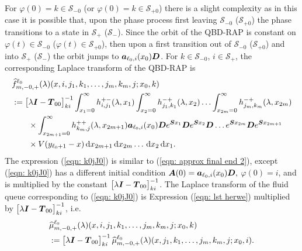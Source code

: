 For \(\varphi(0)=k\in\mathcal S_{-0}\) (or \(\varphi(0)=k\in\mathcal S_{+0}\)) there is a slight complexity as in this case it is possible that, upon the phase process first leaving \(\mathcal S_{-0}\) (\(\mathcal S_{+0}\)) the phase transitions to a state in \(\mathcal S_+\) (\(\mathcal S_-\)). Since the orbit of the QBD-RAP is constant on \(\varphi(t)\in\mathcal S_{-0}\) (\(\varphi(t)\in\mathcal S_{+0}\)), then upon a first transition out of \(\mathcal S_{-0}\) (\(\mathcal S_{+0}\)) and into \(\mathcal S_+\) (\(\mathcal S_-\)) the orbit jumps to \(\boldsymbol   a_{\ell_0,i}(x_0)\boldsymbol D\). For \(k\in\mathcal S_{-0}\), \(i\in\mathcal S_+\), the corresponding Laplace transform of the QBD-RAP is
\begin{align}
	&\widehat{f}_{m,-0,+}^{\ell_0}(\lambda)(x,i,j_1,k_1,\dots,j_m,k_m,j;x_0,k)\nonumber 
	\\&:=\begin{bmatrix} \lambda \boldsymbol I - \boldsymbol T_{00} \end{bmatrix}^{-1}_{ki}\int_{x_1=0}^\infty h^{+-}_{i,j_{1}}(\lambda,x_1)\nonumber
	\int_{x_2=0}^\infty h^{-+}_{j_1,k_1}(\lambda,x_2)
	\hdots \int_{x_{2m}=0}^\infty h^{-+}_{j_{m},k_m}(\lambda, x_{2m})  
	\\&\qquad \times\int_{x_{2m+1}=0}^\infty h^{++}_{k_m,j}(\lambda,x_{2m+1})
	 \boldsymbol   a_{\ell_0,i}(x_0)\boldsymbol De^{\boldsymbol{S}x_1} \boldsymbol{D} e^{\boldsymbol{S}x_2} \boldsymbol{D}\dots e^{\boldsymbol{S}x_{2m}}  \boldsymbol{D}e^{\boldsymbol{S}x_{2m+1}} \nonumber 
	 \\&\qquad{}\times V(y_{\ell_0+1}-x)  \, \mathrm{d} x_{2m+1} \, \mathrm{d} x_{2m}\dots\, \mathrm{d} x_2 \, \mathrm{d} x_1.\label{eqn: k0jJ0}
\end{align}
The expression (\ref{eqn: k0jJ0}) is similar to (\ref{eqn: approx final end 2}), except (\ref{eqn: k0jJ0}) has a different initial condition \(\boldsymbol A(0) = \boldsymbol   a_{\ell_0,i}(x_0)\boldsymbol D,\) \(\varphi(0)=i\), and is multiplied by the constant \(\begin{bmatrix} \lambda \boldsymbol I - \boldsymbol T_{00} \end{bmatrix}^{-1}_{ki}\). 
The Laplace transform of the fluid queue corresponding to (\ref{eqn: k0jJ0}) is Expression (\ref{eqn: lst herwe}) multiplied by \(\begin{bmatrix} \lambda \boldsymbol I - \boldsymbol T_{00} \end{bmatrix}^{-1}_{ki}\), i.e.
\begin{align}
	&\widehat \mu_{m,-0,+}^{\ell_0}(\lambda)(x,i,j_1,k_1,\dots,j_m,k_m,j;x_0,k) \nonumber 
	\\&:= \begin{bmatrix} \lambda \boldsymbol I - \boldsymbol T_{00} \end{bmatrix}^{-1}_{ki}\widehat \mu_{m,-0,+}^{\ell_0}(\lambda)(x,j_1,k_1,\dots,j_m,k_m,j;x_0,i).
\end{align}

